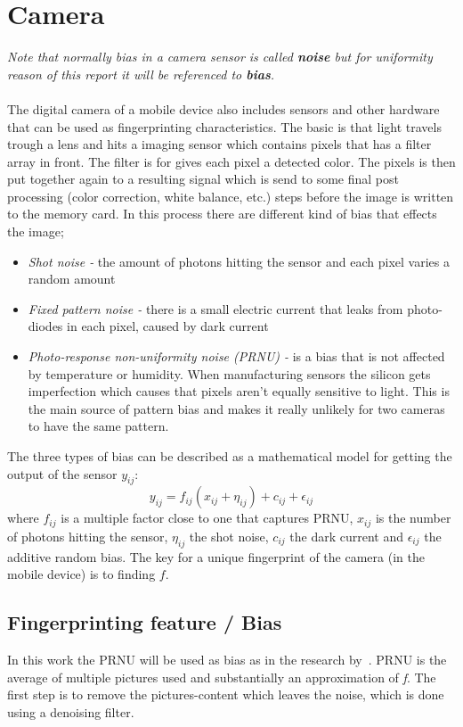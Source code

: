 \section{Camera}\label{sec:char:camera}
\textit{Note that normally bias in a camera sensor is called \textbf{noise} but for uniformity reason of this report it will be referenced to \textbf{bias}.}\\
\\
The digital camera of a mobile device also includes sensors and other hardware that can be used as fingerprinting characteristics. The basic is that light travels trough a lens and hits a imaging sensor which contains pixels that has a filter array in front. The filter is for gives each pixel a detected color. The pixels is then put together again to a resulting signal which is send to some final post processing (color correction, white balance, etc.) steps before the image is written to the memory card. In this process there are different kind of bias that effects the image;
\begin{itemize}
	\item[] \textit{Shot noise -} the amount of photons hitting the sensor and each pixel varies a random amount
	\item[] \textit{Fixed pattern noise - }there is a small electric current that leaks from photo-diodes in each pixel, caused by dark current
	\item[] \textit{Photo-response non-uniformity noise (PRNU) -} is a bias that is not affected by temperature or humidity. When manufacturing sensors the silicon gets imperfection which causes that pixels aren't equally sensitive to light. This is the main source of pattern bias and makes it really unlikely for two cameras to have the same pattern.
\end{itemize}
The three types of bias can be described as a mathematical model for getting the output of the sensor $y_{ij}$:
$$y_{ij}=f_{ij}(x_{ij}+\eta_{ij})+c_{ij}+\epsilon_{ij}$$
where $f_{ij}$ is a multiple factor close to one that captures PRNU, $x_{ij}$ is the number of photons hitting the sensor, $\eta_{ij}$ the shot noise, $c_{ij}$ the dark current and $\epsilon_{ij}$ the additive random bias. The key for a unique fingerprint of the camera (in the mobile device) is to finding $f$.~\cite[]{sensor:camera:DCIdent}

\subsection{Fingerprinting feature / Bias}
In this work the PRNU will be used as bias as in the research by~\cite{sensor:camera:DCIdent}. PRNU is the average of multiple pictures used and substantially an approximation of \textit{f}. The first step is to remove the pictures-content which leaves the noise, which is done using a denoising filter. 

